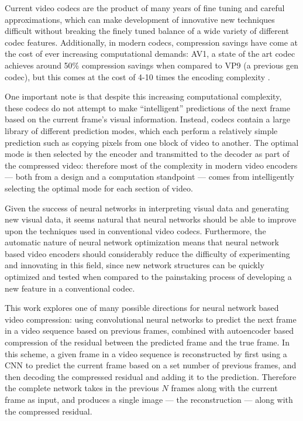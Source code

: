 \documentclass[10pt,twocolumn,letterpaper]{article}
\begin{document}
Current video codecs are the product of many years of fine tuning and careful approximations, which can make development of innovative new techniques difficult without breaking the finely tuned balance of a wide variety of different codec features. Additionally, in modern codecs, compression savings have come at the cost of ever increasing computational demands: AV1, a state of the art codec achieves around 50\% compression savings when compared to VP9 (a previous gen codec), but this comes at the cost of 4-10 times the encoding complexity \cite{netflix}.

One important note is that despite this increasing computational complexity, these codecs do not attempt to make ``intelligent'' predictions of the next frame based on the current frame's visual information. Instead, codecs contain a large library of different prediction modes, which each perform a relatively simple prediction such as copying pixels from one block of video to another. The optimal mode is then selected by the encoder and transmitted to the decoder as part of the compressed video: therefore most of the complexity in modern video encoders --- both from a design and a computation standpoint --- comes from intelligently selecting the optimal mode for each section of video.

Given the success of neural networks in interpreting visual data and generating new visual data, it seems natural that neural networks should be able to improve upon the techniques used in conventional video codecs. Furthermore, the automatic nature of neural network optimization means that neural network based video encoders should considerably reduce the difficulty of experimenting and innovating in this field, since new network structures can be quickly optimized and tested when compared to the painstaking process of developing a new feature in a conventional codec.

This work explores one of many possible directions for neural network based video compression: using convolutional neural networks to predict the next frame in a video sequence based on previous frames, combined with autoencoder based compression of the residual between the predicted frame and the true frame. In this scheme, a given frame in a video sequence is reconstructed by first using a CNN to predict the current frame based on a set number of previous frames, and then decoding the compressed residual and adding it to the prediction. Therefore the complete network takes in the previous $N$ frames along with the current frame as input, and produces a single image --- the reconstruction --- along with the compressed residual.
\end{document}
